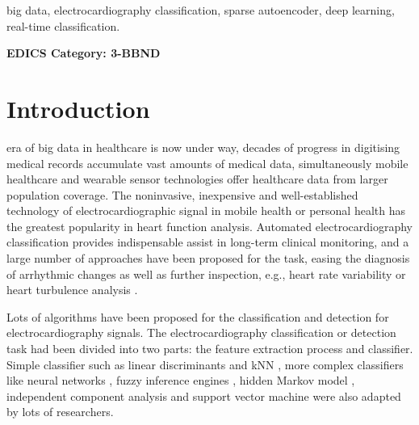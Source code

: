 \documentclass[journal]{IEEEtran}
\begin{document}
\begin{IEEEkeywords}
big data, electrocardiography classification, sparse autoencoder, deep learning, real-time classification.
\end{IEEEkeywords}

 \ifCLASSOPTIONpeerreview
 \begin{center} \bfseries EDICS Category: 3-BBND \end{center}
 \fi
%
\IEEEpeerreviewmaketitle



\section{Introduction}
% 
% 
% 
% 
 era of big data in healthcare is now under way, decades of progress in digitising medical records accumulate vast amounts of medical data, simultaneously mobile healthcare and wearable sensor technologies offer healthcare data from larger population coverage.
The noninvasive, inexpensive and well-established technology of electrocardiographic signal in mobile health or personal health has the greatest popularity in heart function analysis.
Automated electrocardiography classification provides indispensable assist in long-term clinical monitoring, and a large number of approaches have been proposed for the task, easing the diagnosis of arrhythmic changes as well as further inspection, e.g., heart rate variability or heart turbulence analysis \cite{mar}. 


Lots of algorithms have been proposed for the classification and detection for electrocardiography signals. 
The electrocardiography classification or detection task had been divided into two parts: the feature extraction process and classifier. 
Simple classifier such as linear discriminants \cite{chaza} and kNN \cite{melgan}, more complex classifiers like neural networks \cite{jiang, olmez, lin, osowski}, fuzzy inference engines \cite{osowski, kundu}, hidden Markov model \cite{andreao, coast}, independent component analysis \cite{zhu} and support vector machine  \cite{melgan, kampoura, khandoker} were also adapted by lots of researchers.  
\end{document}

